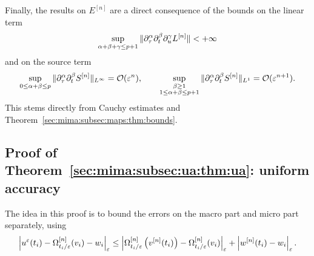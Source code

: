 %

Finally, the results on $E^{[n]}$ are a direct consequence of the bounds
on the linear term 
$$ 
\sup_{\alpha+\beta+\gamma \leq p+1} \| \partial_{\tau}^{\alpha} \partial_t^{\beta} \partial_{u}^{\gamma} L^{[n]} \| < + \infty 
$$ 
and on the source term 
$$ 
\sup_{0 \leq \alpha + \beta \leq p} \| \partial_{\tau}^{\alpha} \partial_t^{\beta} S^{[n]} \|_{L^{\infty}} = \mathcal{O}(\varepsilon^n) , 
\qquad 
\sup_{\substack{\beta \geq 1 \\ 1 \leq \alpha + \beta \leq p+1}} \| \partial_{\tau}^{\alpha} \partial_t^{\beta} S^{[n]} \|_{L^1} = \mathcal{O}( \varepsilon^{n+1} ) . 
$$
This stems directly from Cauchy estimates and
Theorem~\ref{sec:mima:subsec:maps:thm:bounds}. 
\vspace*{-6pt}
\begin{flushright}
\qedsymbol    
\end{flushright}







\subsection{Proof of Theorem~\ref{sec:mima:subsec:ua:thm:ua}: uniform
accuracy}
\label{sec:proofs:subsec:ua}

The idea in this proof is to bound the errors on the macro part and micro
part separately, using 
$$
\left\vert  u^{\varepsilon}(t_i) - \Omega^{[n]}_{t_i/\varepsilon}(v_i) - w_i  \right\vert _{\varepsilon} 
\leq \left\vert  \Omega^{[n]}_{t_i/\varepsilon} \left( v^{[n]}(t_i) \right) - \Omega^{[n]}_{t_i/\varepsilon}(v_i)  \right\vert _{\varepsilon} 
+ \left\vert  w^{[n]}(t_i) - w_i  \right\vert _{\varepsilon} . 
$$

